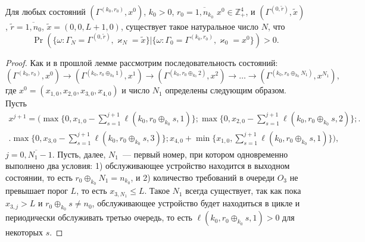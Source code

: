 \documentclass{report}
\begin{document}
\begin{lemma}\label{class:2}
Для любых состояний $(\Gamma^{(k_0,r_0)},x^0)$, $k_0 > 0$, $r_0=\overline{1,n_{k_0}}$ $x^0 \in \mathbb{Z}_+^4$, и $(\Gamma^{(0,\tilde{r})},\tilde{x})$, $\tilde{r} = \overline{1,n_0}$, $\tilde{x}=(0,0,L+1,0)$, существует такое натуральное число $N$, что 
\begin{equation*}
\Pr(\{\omega\colon \Gamma_{N}=\Gamma^{(0,\tilde{r} )}, \varkappa_{N}=\tilde{x}\}|\{\omega\colon 
\Gamma_{0}=\Gamma^{(k_0,r_0)}, \varkappa_{0}=x^0\})>0.
\end{equation*}
\end{lemma}
\begin{proof}
Как и в прошлой лемме рассмотрим последовательность состояний: 
\begin{equation*}
(\Gamma^{(k_0,r_0)},x^0) \rightarrow (\Gamma^{(k_0,r_0\oplus_{k_0}1)},x^1) \rightarrow (\Gamma^{(k_0,r_0\oplus_{k_0}2)},x^2) \rightarrow \ldots \rightarrow (\Gamma^{(k_0,r_0\oplus_{k_0}N_1)},x^{N_1}),
\end{equation*}
где $x^0=(x_{1,0}, x_{2,0}, x_{3,0}, x_{4,0})$ и число $N_1$ определены следующим образом. Пусть 
\begin{multline*}
x^{j+1}=\biggl(\max{\biggl\{0,x_{1,0} - \sum_{s=1}^{j+1}\ell(k_0,r_0\oplus_{k_0}s,1)\biggr\}};
\max{\biggl\{0,x_{2,0} - \sum_{s=1}^{j+1}\ell(k_0,r_0\oplus_{k_0}s,2)\biggr\}};\biggr.\\
\biggl.\max{\biggl\{0,x_{3,0} - \sum_{s=1}^{j+1}\ell(k_0,r_0\oplus_{k_0}s,3)\biggr\}};
x_{4,0} + \min{\biggl\{x_{1,0}, \sum_{s=1}^{j+1}\ell(k_0,r_0\oplus_{k_0}s,1)\biggr\}}\biggr),
\end{multline*}
$j=\overline{0,N_1-1}$. Пусть, далее, $N_1$~--- первый номер, при котором одновременно выполнено два условия: 1) обслуживающее устройство находится в выходном состоянии, то есть $r_0\oplus_{k_0}N_1 = n_{k_0}$, и 2) количество требований в очереди $O_3$ не превышает порог $L$, то есть  $x_{3,N_1}\leqslant L$. Такое $N_1$ всегда существует, так как пока $x_{3,j}>L$ и $r_0\oplus_{k_0}s \neq n_0$, обслуживающее устройство будет находиться в цикле и периодически обслуживать третью очередь, то есть $\ell(k_0,r_0\oplus_{k_0}s,1)>0$  для некоторых $s$.


\end{proof}
\end{document}
